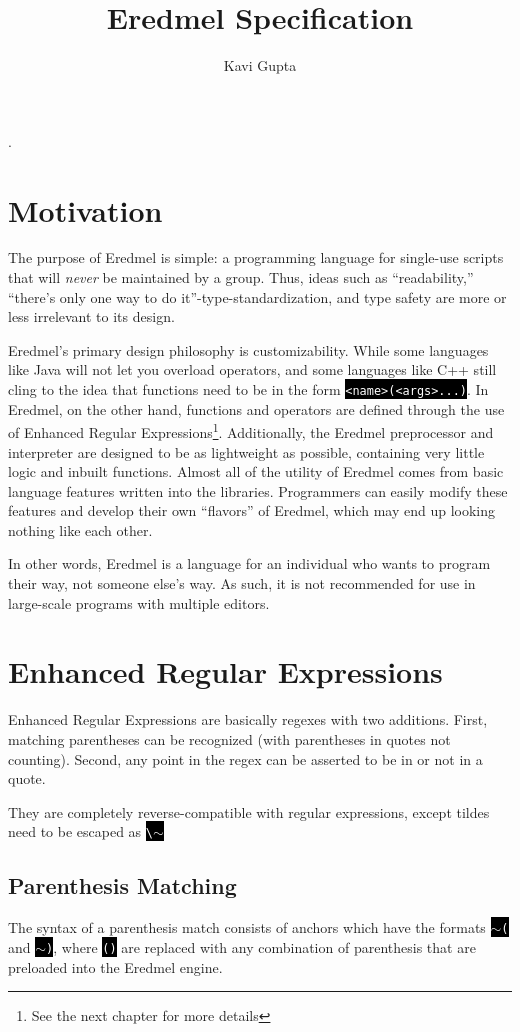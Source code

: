 \documentclass{book}
\newcommand\code\texttt
\newcommand{\codebox}[1]{\leavevmode\colorbox{black}{\textcolor{white}{\code{#1}}}}
\newcommand{\bak}{\textbackslash}
\newcommand{\til}{$\sim$}
\begin{document}
\title{Eredmel Specification}.
\author{Kavi Gupta}
\maketitle

\chapter{Motivation}

The purpose of Eredmel is simple: a programming language for single-use scripts that will \emph{never} be maintained by a group. Thus, ideas such as ``readability,'' ``there's only one way to do it''-type-standardization, and type safety are more or less irrelevant to its design.

Eredmel's primary design philosophy is customizability. While some languages like Java will not let you overload operators, and some languages like C++ still cling to the idea that functions need to be in the form \codebox{<name>(<args>...)}. In Eredmel, on the other hand, functions and operators are defined through the use of Enhanced Regular Expressions\footnote{See the next chapter for more details}. Additionally, the Eredmel preprocessor and interpreter are designed to be as lightweight as possible, containing very little logic and inbuilt functions. Almost all of the utility of Eredmel comes from basic language features written into the libraries. Programmers can easily modify these features and develop their own ``flavors'' of Eredmel, which may end up looking nothing like each other.

In other words, Eredmel is a language for an individual who wants to program their way, not someone else's way. As such, it is not recommended for use in large-scale programs with multiple editors.

\chapter{Enhanced Regular Expressions}

Enhanced Regular Expressions are basically regexes with two additions. First, matching parentheses can be recognized (with parentheses in quotes not counting). Second, any point in the regex can be asserted to be in or not in a quote.

They are completely reverse-compatible with regular expressions, except tildes need to be escaped as \codebox{\bak\til}

\section{Parenthesis Matching}
The syntax of a parenthesis match consists of anchors which have the formats \codebox{\til(} and \codebox{\til)}, where \codebox{()} are replaced with any combination of parenthesis that are preloaded into the Eredmel engine. 
\end{document}
